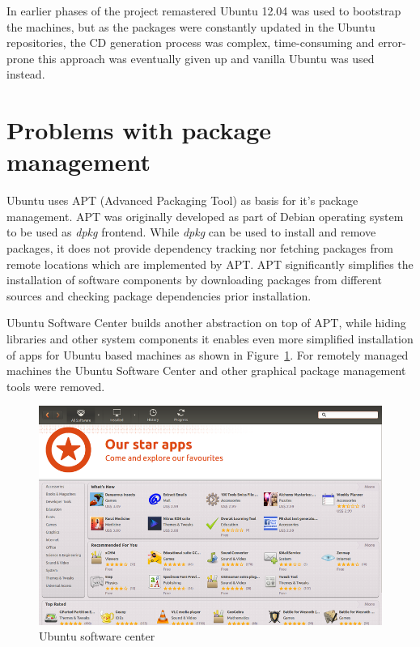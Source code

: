 \documentclass[a4paper,11pt]{kth-mag}
\begin{document}
In earlier phases of the project remastered Ubuntu 12.04
was used to bootstrap the machines, but as the
packages were constantly updated in the Ubuntu repositories,
the CD generation process was complex, time-consuming and
error-prone this approach was eventually given up
and vanilla Ubuntu was used instead.


\section{Problems with package management}

Ubuntu uses APT (Advanced Packaging Tool) as basis for
it's package management.
APT was originally developed as part of Debian operating system
to be used as \emph{dpkg} frontend.
While \emph{dpkg} can be used to install and remove packages,
it does not provide dependency tracking nor fetching
packages from remote locations which are implemented by APT.
APT significantly simplifies the installation of software
components by downloading packages from different sources
and checking package dependencies prior installation.

Ubuntu Software Center builds another abstraction on top of APT,
while hiding libraries and other system components it enables
even more simplified installation of apps for Ubuntu based
machines as shown in Figure~\ref{fig:ubuntu-software-center}.
For remotely managed machines the Ubuntu Software Center
and other graphical package management tools were removed.

\begin{figure}[tbhp]
  \centering
  \includegraphics[width=\textwidth]{images/ubuntu-software-center.png}
  \caption{Ubuntu software center}
  \label{fig:ubuntu-software-center}
\end{figure}
\end{document}
